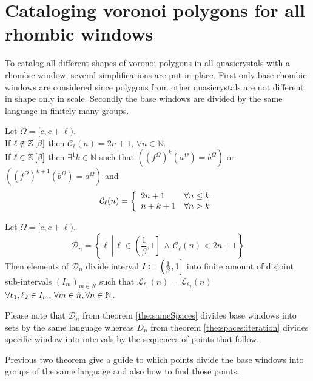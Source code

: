 \documentclass[text.tex]{subfiles}
\begin{document}
\section{Cataloging voronoi polygons for all rhombic windows}

To catalog all different shapes of voronoi polygons in all quasicrystals with a rhombic window, several simplifications are put in place.
First only base rhombic windows are considered since polygons from other quasicrystals are not different in shape only in scale. Secondly the base windows are divided by the same language in finitely many groups. 

\begin{theorem}
\label{the:complexity}
Let $\Omega = [c,c+\ell)$.\\
If $\ell \notin \mathbb{Z}\left[\beta\right]$ then $\mathcal{C}_{\ell}(n) = 2n+1,\, \forall n\in\mathbb{N}$. \\
If $\ell \in \mathbb{Z}\left[\beta\right]$ then $\exists^1 k \in \mathbb{N}$ such that $\left({(f^\Omega)}^{k}(a^\Omega) = b^\Omega\right)$ or $\left({(f^\Omega)}^{k+1}(b^\Omega) = a^\Omega\right)$ and 
$$\mathcal{C}_{\ell}(n) = \left\{
	\begin{array}{l l}
		2n+1	&	\forall n\leq k \\
		n+k+1	&	\forall n > k
	\end{array}
	\right.
$$
\end{theorem}

\begin{theorem}
\label{the:sameSpaces}
Let $\Omega = [c,c+\ell)$.
$$\mathcal{D}_n = \left\{ \ell\,\left|\, \ell\in \left(\frac{1}{\beta},1\right] \,\wedge\, \mathcal{C}_\ell(n) < 2n+1 \right.\right\}$$
Then elements of $\mathcal{D}_n$ divide interval $I \vcentcolon= \left(\frac{1}{\beta},1\right]$ into finite amount of disjoint sub-intervals $(I_m)_{m\in\hat{N}}$ such that $\mathcal{L}_{\ell_1}(n) = \mathcal{L}_{\ell_2}(n)$ $\forall \ell_1, \ell_2 \in I_m,\, \forall m\in\hat{n}, \forall n\in\mathbb{N}$.
\end{theorem}

\begin{remark}
Please note that $\mathcal{D}_n$ from theorem \ref{the:sameSpaces} divides base windows into sets by the same language whereas $D_n$ from theorem \ref{the:spaces:iteration} divides specific window into intervals by the sequences of points that follow.
\end{remark}

Previous two theorem give a guide to which points divide the base windows into groups of the same language and also how to find those points. 
\end{document}
